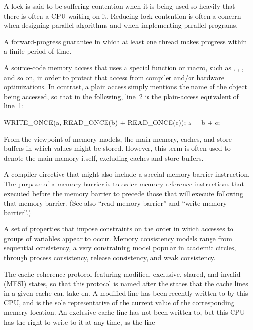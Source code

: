 \begin{description}
	A lock is said to be suffering contention when it is being
	used so heavily that there is often a CPU waiting on it.
	Reducing lock contention is often a concern when designing
	parallel algorithms and when implementing parallel programs.
\item[\IXG{Lock Free}:]
	A forward-progress guarantee in which at least one thread makes
	progress within a finite period of time.
\item[\IXG{Marked Access}:]
	A source-code memory access that uses a special function or
	macro, such as , ,
	, and so on, in order to protect that access
	from compiler and/or hardware optimizations.
	In contrast, a plain access simply mentions the name of
	the object being accessed, so that in the following, line~2
	is the plain-access equivalent of line~1:
	\begin{VerbatimN}
	WRITE_ONCE(a, READ_ONCE(b) + READ_ONCE(c));
	a = b + c;
	\end{VerbatimN}
\item[\IXG{Memory}:]
	From the viewpoint of memory models, the main memory,
	caches, and store buffers in which values might be stored.
	However, this term is often used to denote the main memory
	itself, excluding caches and store buffers.
\item[\IXG{Memory Barrier}:]
	A compiler directive that might also include a special
	memory-barrier instruction.
	The purpose of a memory barrier is to order memory-reference
	instructions that executed before the memory barrier to precede
	those that will execute following that memory barrier.
	(See also ``read memory barrier'' and ``write memory barrier''.)
\item[\IXG{Memory Consistency}:]
	A set of properties that impose constraints on the order in
	which accesses to groups of variables appear to occur.
	Memory consistency models range from sequential consistency,
	a very constraining model popular in academic circles, through
	process consistency, release consistency, and weak consistency.
\item[\IXGaltr{MESI Protocol}{MESI protocol}:]
	The
	cache-coherence protocol featuring
	modified, exclusive, shared, and invalid (MESI) states,
	so that this protocol is named after the states that the
	cache lines in a given cache can take on.
	A modified line has been recently written to by this CPU,
	and is the sole representative of the current value of
	the corresponding memory location.
	An exclusive cache line has not been written to, but this
	CPU has the right to write to it at any time, as the line

\end{description}
